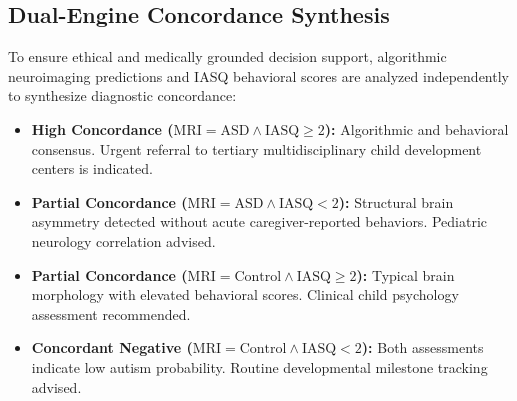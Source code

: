 \documentclass[conference]{IEEEtran}
\begin{document}
\subsection{Dual-Engine Concordance Synthesis}
To ensure ethical and medically grounded decision support, algorithmic neuroimaging predictions and IASQ behavioral scores are analyzed independently to synthesize diagnostic concordance:
\begin{itemize}
    \item \textbf{High Concordance ($\text{MRI} = \text{ASD} \land \text{IASQ} \ge 2$):} Algorithmic and behavioral consensus. Urgent referral to tertiary multidisciplinary child development centers is indicated.
    \item \textbf{Partial Concordance ($\text{MRI} = \text{ASD} \land \text{IASQ} < 2$):} Structural brain asymmetry detected without acute caregiver-reported behaviors. Pediatric neurology correlation advised.
    \item \textbf{Partial Concordance ($\text{MRI} = \text{Control} \land \text{IASQ} \ge 2$):} Typical brain morphology with elevated behavioral scores. Clinical child psychology assessment recommended.
    \item \textbf{Concordant Negative ($\text{MRI} = \text{Control} \land \text{IASQ} < 2$):} Both assessments indicate low autism probability. Routine developmental milestone tracking advised.
\end{itemize}
\end{document}
